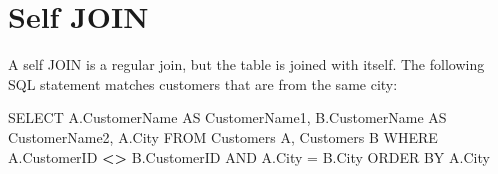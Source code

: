 \documentclass[
]{book}
\newenvironment{Shaded}{\begin{snugshade}}{\end{snugshade}}
\newcommand{\AttributeTok}[1]{\textcolor[rgb]{0.13,0.29,0.53}{#1}}
\newcommand{\ErrorTok}[1]{\textcolor[rgb]{0.64,0.00,0.00}{\textbf{#1}}}
\newcommand{\FunctionTok}[1]{\textcolor[rgb]{0.13,0.29,0.53}{\textbf{#1}}}
\newcommand{\NormalTok}[1]{#1}
\newcommand{\OtherTok}[1]{\textcolor[rgb]{0.56,0.35,0.01}{#1}}
\newcommand{\SpecialCharTok}[1]{\textcolor[rgb]{0.81,0.36,0.00}{\textbf{#1}}}
\newcommand{\StringTok}[1]{\textcolor[rgb]{0.31,0.60,0.02}{#1}}
\begin{document}
\begin{Shaded}
\end{Shaded}

\hypertarget{self-join}{%
\section{Self JOIN}\label{self-join}}

A self JOIN is a regular join, but the table is joined with itself. The following SQL statement matches customers that are from the same city:

\begin{Shaded}
\begin{Highlighting}[]
\NormalTok{SELECT A.CustomerName AS CustomerName1, }
\NormalTok{       B.CustomerName AS CustomerName2, }
\NormalTok{       A.City}
\NormalTok{  FROM Customers A, }
\NormalTok{       Customers B}
\NormalTok{    WHERE A.CustomerID }\SpecialCharTok{\textless{}}\ErrorTok{\textgreater{}}\NormalTok{ B.CustomerID}
\NormalTok{      AND A.City }\OtherTok{=}\NormalTok{ B.City}
\NormalTok{        ORDER BY A.City}
\end{Highlighting}
\end{Shaded}

\begin{Shaded}
\end{Shaded}
\end{document}
